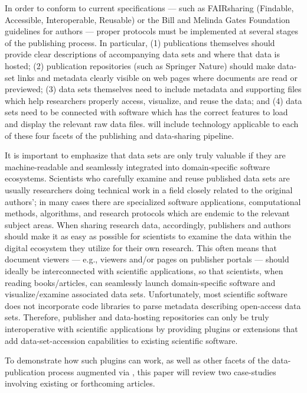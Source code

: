 \documentclass[11pt,letterpaper]{article}
\newcommand{\ATexttclr}[1]{\textcolor{tcolor}{\textbf{#1}}}
\newcommand{\textscc}[1]{{\color{orr!35!black}{{%
						\fontfamily{Cabin-TLF}\fontseries{b}\selectfont{\textsc{\scriptsize{#1}}}}}}}
\newcommand{\AcronymText}[1]{{\textscc{#1}}}
\newcommand{\SDRF}{\resizebox{!}{7pt}{\ATexttclr{SDRF}}}
\newcommand{\lSDRF}{\resizebox{!}{8pt}{\ATexttclr{S}}%
\resizebox{!}{7pt}{\ATexttclr{DRF}}}
\newcommand{\HTML}{\resizebox{!}{7pt}{\AcronymText{HTML}}}
\newcommand{\PDF}{\resizebox{!}{7pt}{\AcronymText{PDF}}}
\newcommand{\p}[1]{

\vspace{.7em}#1}
\begin{document}
{\p{In order to conform to current specifications --- such as FAIRsharing (Findable, Accessible, Interoperable, Reusable) or the Bill and Melinda Gates Foundation guidelines for authors --- proper protocols must be implemented at several stages of the publishing process.  In particular, (1) publications themselves should provide clear descriptions of accompanying data sets and where that data is hosted; (2) publication repositories (such as Springer Nature) should make data-set links and metadata clearly visible on web pages where documents are read or previewed; (3) data sets themselves need to include metadata and supporting files which help researchers properly access, visualize, and reuse the data; and (4) data sets need to be connected with software which has the correct features to load and display the relevant raw data files.  \lSDRF{} will include technology applicable to each of these four facets of the publishing and data-sharing pipeline.}

\p{It is important to emphasize that data sets are only truly valuable if they are machine-readable and seamlessly integrated into domain-specific software ecosystems.  Scientists who carefully examine and reuse published data sets are usually researchers doing technical work in a field closely related to the original authors'; in many cases there are specialized software applications, computational methods, algorithms, and research protocols which are endemic to the relevant subject areas.  When sharing research data, accordingly, publishers and authors should make it as easy as possible for scientists to examine the data within the digital ecosystem they utilize for their own research.  This often means that document viewers --- e.g., \PDF{} viewers and/or \HTML{} pages on publisher portals --- should ideally be interconnected with scientific applications, so that scientists, when reading books/articles, can seamlessly launch domain-specific software and visualize/examine associated data sets.  Unfortunately, most scientific software does not incorporate code libraries to parse metadata describing open-access data sets.  Therefore, publisher and data-hosting repositories can only be truly interoperative with scientific applications by providing plugins or extensions that add data-set-accession capabilities to existing scientific software.}

\p{To demonstrate how such plugins can work, as well as other facets of the data-publication process augmented via \SDRF{}, this paper will review two case-studies involving existing or forthcoming articles.}

}
\end{document}
